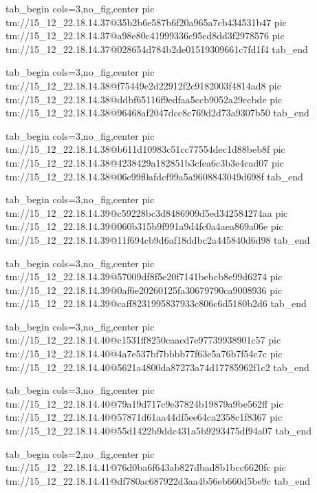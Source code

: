 \ifcmt
  tab_begin cols=3,no_fig,center
    pic tm://15_12_22.18.14.37@35b2b6e587b6f20a965a7cb434531b47
    pic tm://15_12_22.18.14.37@a98e80c41999336c95cd8dd3f2978576
    pic tm://15_12_22.18.14.37@028654d784b2de01519309661c7fd1f4
  tab_end
\fi


\ifcmt
  tab_begin cols=3,no_fig,center
    pic tm://15_12_22.18.14.38@f75449e2d22912f2c9182003f4814ad8
    pic tm://15_12_22.18.14.38@ddbf65116f9edfaa5ccb9052a29ccbde
    pic tm://15_12_22.18.14.38@96468af2047dcc8c769d2d73a9307b50
  tab_end
\fi


\ifcmt
  tab_begin cols=3,no_fig,center
    pic tm://15_12_22.18.14.38@b611d10983c51cc77554dec1d88beb8f
    pic tm://15_12_22.18.14.38@4238429a182851b3cfea6c3b3e4cad07
    pic tm://15_12_22.18.14.38@06e99f0afdcf99a5a9608843049d698f
  tab_end
\fi


\ifcmt
  tab_begin cols=3,no_fig,center
    pic tm://15_12_22.18.14.39@c59228bc3d8486909d5ed342584274aa
    pic tm://15_12_22.18.14.39@060b315b9f991a9d4fc0a4aea869a06e
    pic tm://15_12_22.18.14.39@11f694cb9d6af18ddbc2a445840d6d98
  tab_end
\fi


\ifcmt
  tab_begin cols=3,no_fig,center
    pic tm://15_12_22.18.14.39@57009df8f5e20f7141bebcb8e99d6274
    pic tm://15_12_22.18.14.39@0af6e20260125fa30679790ca9008936
    pic tm://15_12_22.18.14.39@caff8231995837933c806c6d5180b2d6
  tab_end
\fi


\ifcmt
  tab_begin cols=3,no_fig,center
    pic tm://15_12_22.18.14.40@c1531ff8250caacd7e97739938901c57
    pic tm://15_12_22.18.14.40@4a7e537bf7bbbb77f63e5a76b7f54c7c
    pic tm://15_12_22.18.14.40@5621a4800da87273a74d17785962f1c2
  tab_end
\fi


\ifcmt
  tab_begin cols=3,no_fig,center
    pic tm://15_12_22.18.14.40@79a19d717c9e37824b19879a9be562ff
    pic tm://15_12_22.18.14.40@57871d61aa44df5ee64ca2358c1f8367
    pic tm://15_12_22.18.14.40@55d1422b9ddc431a5b9293475df94a07
  tab_end
\fi


\ifcmt
  tab_begin cols=2,no_fig,center
    pic tm://15_12_22.18.14.41@76d0ba6f643ab827dbad8b1bcc6620fc
    pic tm://15_12_22.18.14.41@df780ac687922d3aa4b56eb660d5be9c
  tab_end
\fi

